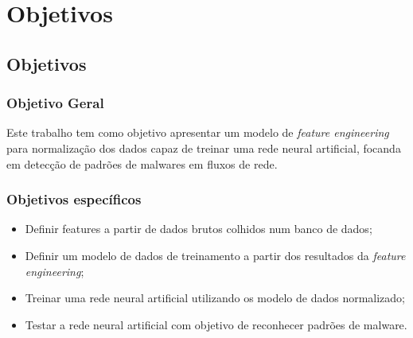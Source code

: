 \part{Objetivos}
\chapter[Objetivos]{Objetivos}

\section{Objetivo Geral}
    Este trabalho tem como objetivo apresentar um modelo de \textit{feature engineering} para normalização dos dados capaz de treinar uma rede neural artificial, focanda em detecção de padrões de malwares em fluxos de rede.


\section{Objetivos específicos}
    \begin{itemize}
        \item Definir features a partir de dados brutos colhidos num banco de dados;
        \item Definir um modelo de dados de treinamento a partir dos resultados da \textit{feature engineering};
        \item Treinar uma rede neural artificial utilizando os modelo de dados normalizado;
        \item Testar a rede neural artificial com objetivo de reconhecer padrões de malware.
    \end{itemize}